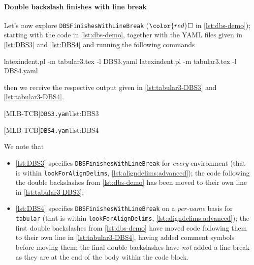 \documentclass[10pt]{article}
\newcommand{\ElseFinishesWithLineBreak}{\color{red}\square}
\begin{document}
 \paragraph{Double backslash finishes with line break}
  \begin{example}
  Let's now explore \texttt{DBSFinishesWithLineBreak} ($\ElseFinishesWithLineBreak$ in
  \cref{lst:dbs-demo}); starting with the code in \cref{lst:dbs-demo}, together with the
  YAML files given in \cref{lst:DBS3} and \cref{lst:DBS4} and running the following
  commands   

  \begin{commandshell}
latexindent.pl -m tabular3.tex -l DBS3.yaml
latexindent.pl -m tabular3.tex -l DBS4.yaml
\end{commandshell}

  then we receive the respective output given in \cref{lst:tabular3-DBS3} and
  \cref{lst:tabular3-DBS4}.

  \begin{cmhtcbraster}
   [MLB-TCB]{\texttt{DBS3.yaml}}{lst:DBS3}
  \end{cmhtcbraster}

  \begin{cmhtcbraster}
   [MLB-TCB]{\texttt{DBS4.yaml}}{lst:DBS4}
  \end{cmhtcbraster}

  We note that
  \begin{itemize}
   \item \cref{lst:DBS3} specifies \texttt{DBSFinishesWithLineBreak} for
         \emph{every} environment (that is within \texttt{lookForAlignDelims},
         \vref{lst:aligndelims:advanced});
         the code following the double backslashes from \cref{lst:dbs-demo} has been moved to
         their own line in \cref{lst:tabular3-DBS3};
   \item \cref{lst:DBS4} specifies \texttt{DBSFinishesWithLineBreak} on a
         \emph{per-name} basis for \texttt{tabular} (that is within \texttt{lookForAlignDelims},
         \vref{lst:aligndelims:advanced});
         the first double backslashes from \cref{lst:dbs-demo} have moved code following them to
         their own line in \cref{lst:tabular3-DBS4}, having added comment symbols before moving
         them; the final double backslashes have \emph{not} added a line break as they are at the
         end of the body within the code block.
  \end{itemize}
  \end{example}
\end{document}
